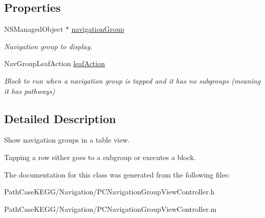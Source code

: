 \subsection*{Properties}
\begin{DoxyCompactItemize}
\item 
\hypertarget{interface_p_c_navigation_group_view_controller_af95f6ff2762ecf5c62096c9305ca9e67}{
NSManagedObject $\ast$ \hyperlink{interface_p_c_navigation_group_view_controller_af95f6ff2762ecf5c62096c9305ca9e67}{navigationGroup}}
\label{interface_p_c_navigation_group_view_controller_af95f6ff2762ecf5c62096c9305ca9e67}

\begin{DoxyCompactList}\small\item\em Navigation group to display. \end{DoxyCompactList}\item 
\hypertarget{interface_p_c_navigation_group_view_controller_ae84204510227c16cad6b9cda00e3ff1f}{
NavGroupLeafAction \hyperlink{interface_p_c_navigation_group_view_controller_ae84204510227c16cad6b9cda00e3ff1f}{leafAction}}
\label{interface_p_c_navigation_group_view_controller_ae84204510227c16cad6b9cda00e3ff1f}

\begin{DoxyCompactList}\small\item\em Block to run when a navigation group is tapped and it has no subgroups (meaning it has pathways) \end{DoxyCompactList}\end{DoxyCompactItemize}


\subsection{Detailed Description}
Show navigation groups in a table view. 

Tapping a row either goes to a subgroup or executes a block. 

The documentation for this class was generated from the following files:\begin{DoxyCompactItemize}
\item 
PathCaseKEGG/Navigation/PCNavigationGroupViewController.h\item 
PathCaseKEGG/Navigation/PCNavigationGroupViewController.m\end{DoxyCompactItemize}
